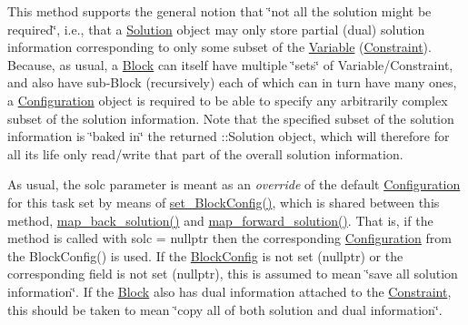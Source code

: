 This method supports the general notion that \char`\"{}not all the solution might
be required\char`\"{}, i.\+e., that a \mbox{\hyperlink{class_s_m_spp__di__unipi__it_1_1_solution}{Solution}} object may only store partial (dual) solution information corresponding to only some subset of the \mbox{\hyperlink{class_s_m_spp__di__unipi__it_1_1_variable}{Variable}} (\mbox{\hyperlink{class_s_m_spp__di__unipi__it_1_1_constraint}{Constraint}}). Because, as usual, a \mbox{\hyperlink{class_s_m_spp__di__unipi__it_1_1_block}{Block}} can itself have multiple \char`\"{}sets\char`\"{} of Variable/\+Constraint, and also have sub-\/\+Block (recursively) each of which can in turn have many ones, a \mbox{\hyperlink{class_s_m_spp__di__unipi__it_1_1_configuration}{Configuration}} object is required to be able to specify any arbitrarily complex subset of the solution information. Note that the specified subset of the solution information is \char`\"{}baked in\char`\"{} the returned \+::\+Solution object, which will therefore for all its life only read/write that part of the overall solution information.

As usual, the solc parameter is meant as an {\itshape override} of the default \mbox{\hyperlink{class_s_m_spp__di__unipi__it_1_1_configuration}{Configuration}} for this task set by means of \mbox{\hyperlink{class_s_m_spp__di__unipi__it_1_1_block_a18d411b740a47db00d15083c5c7ef2ba}{set\+\_\+\+Block\+Config()}}, which is shared between this method, \mbox{\hyperlink{class_s_m_spp__di__unipi__it_1_1_block_a04f0a8a608fcc3ded227c2552f67f1a3}{map\+\_\+back\+\_\+solution()}} and \mbox{\hyperlink{class_s_m_spp__di__unipi__it_1_1_block_a7759467d70613a10c1cdb5d3193b4434}{map\+\_\+forward\+\_\+solution()}}. That is, if the method is called with solc = nullptr then the corresponding \mbox{\hyperlink{class_s_m_spp__di__unipi__it_1_1_configuration}{Configuration}} from the Block\+Config() is used. If the \mbox{\hyperlink{class_s_m_spp__di__unipi__it_1_1_block_config}{Block\+Config}} is not set (nullptr) or the corresponding field is not set (nullptr), this is assumed to mean \char`\"{}save all solution
information\char`\"{}. If the \mbox{\hyperlink{class_s_m_spp__di__unipi__it_1_1_block}{Block}} also has dual information attached to the \mbox{\hyperlink{class_s_m_spp__di__unipi__it_1_1_constraint}{Constraint}}, this should be taken to mean \char`\"{}copy all of both solution and
dual information\char`\"{}.

